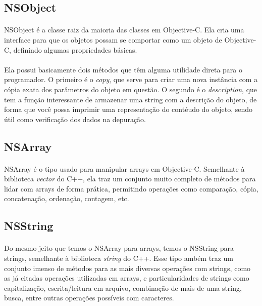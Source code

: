 \documentclass[a4paper,12pt,brazil,doubleside]{book}
\begin{document}
\bigskip

\subsection{NSObject}

\paragraph{}NSObject é a classe raiz da maioria das classes em Objective-C. Ela cria uma interface para que os objetos possam se comportar como um objeto de Objective-C, definindo algumas propriedades básicas.
\paragraph{}Ela possui basicamente dois métodos que têm alguma utilidade direta para o programador. O primeiro é o \emph{copy}, que serve para criar uma nova instância com a cópia exata dos parâmetros do objeto em questão. O segundo é o \emph{description}, que tem a função interessante de armazenar uma string com a descrição do objeto, de forma que você possa imprimir uma representação do contéudo do objeto, sendo útil como verificação dos dados na depuração.

\bigskip

\subsection{NSArray}

\paragraph{}NSArray é o tipo usado para manipular arrays em Objective-C. Semelhante à biblioteca \emph{vector} do C++, ela traz um conjunto muito completo de métodos para lidar com arrays de forma prática, permitindo operações como comparação, cópia, concatenação, ordenação, contagem, etc.

\bigskip

\subsection{NSString}

\paragraph{}Do mesmo jeito que temos o NSArray para arrays, temos o NSString para strings, semelhante à biblioteca \emph{string} do C++. Esse tipo ambém traz um conjunto imenso de métodos para as mais diversas operações com strings, como as já citadas operações utilizadas em arrays, e particularidades de strings como capitalização, escrita/leitura em arquivo, combinação de mais de uma string, busca, entre outras operações possíveis com caracteres.
\end{document}
